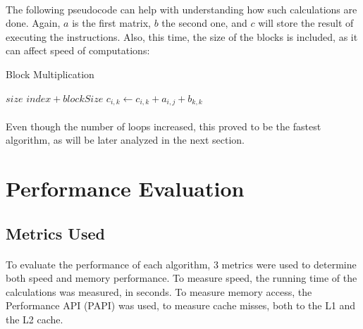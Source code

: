\documentclass[11pt]{report}
\begin{document}
    \paragraph{}The following pseudocode can help with understanding how such calculations are done. Again, $a$ is the first matrix, $b$ the second one, and $c$ will store the result of executing the instructions. Also, this time, the size of the blocks is included, as it can affect speed of computations:

    \begin{algorithm}
      \caption{Block Multiplication}\label{euclid}
      \begin{algorithmic}[1]
        \State \Return $size$
        \Else
        \State \Return $index + blockSize$
        \EndIf
        \EndProcedure
        \State $c_{i, k} \leftarrow c_{i, k} + a_{i, j} + b_{k, k}$
        \EndFor
        \EndFor
        \EndFor
        \EndFor
        \EndFor
        \EndProcedure
      \end{algorithmic}
    \end{algorithm}
    
    \paragraph{}Even though the number of loops increased, this proved to be the fastest algorithm, as will be later analyzed in the next section.

    \section*{Performance Evaluation}

    \subsection*{Metrics Used}

    \paragraph{}To evaluate the performance of each algorithm, 3 metrics were used to determine both speed and memory performance. To measure speed, the running time of the calculations was measured, in seconds. To measure memory access, the Performance API (PAPI) was used, to measure cache misses, both to the L1 and the L2 cache.
\end{document}
